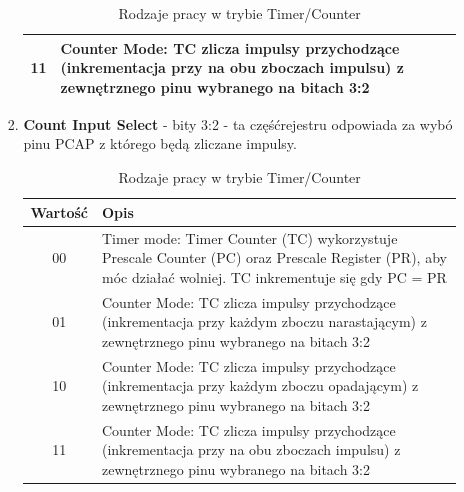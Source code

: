 \begin{enumerate}
\begin{enumerate}
\begin{enumerate}
\begin{table}[H]
\begin{tabular}{|c|p{13cm}|}
                    \hline
                    11 & Counter Mode: TC zlicza impulsy przychodzące (inkrementacja przy na obu zboczach impulsu) z zewnętrznego pinu wybranego na bitach 3:2  \\
                    \hline
                \end{tabular}
                \caption{Rodzaje pracy w trybie Timer/Counter}
            \end{table}
            \item \textbf{Count Input Select} - bity 3:2 - ta częśćrejestru odpowiada za wybó pinu PCAP z którego będą zliczane impulsy.\\
            \begin{table}[H]
                \centering
                \begin{tabular}{|c|p{13cm}|}
                    \hline
                    \rowcolor{gray!30}
                    Wartość & Opis\\
                    \hline
                    00  & Timer mode: Timer Counter (TC) wykorzystuje Prescale Counter (PC) oraz Prescale Register (PR), aby móc działać wolniej. TC inkrementuje się gdy PC = PR\\
                    \hline
                    01 & Counter Mode: TC zlicza impulsy przychodzące (inkrementacja przy każdym zboczu narastającym) z zewnętrznego pinu wybranego na bitach 3:2  \\
                    \hline
                    10 & Counter Mode: TC zlicza impulsy przychodzące (inkrementacja przy każdym zboczu opadającym) z zewnętrznego pinu wybranego na bitach 3:2  \\
                    \hline
                    11 & Counter Mode: TC zlicza impulsy przychodzące (inkrementacja przy na obu zboczach impulsu) z zewnętrznego pinu wybranego na bitach 3:2  \\
                    \hline
                \end{tabular}
                \caption{Rodzaje pracy w trybie Timer/Counter}
            \end{table}
            

\end{enumerate}
\end{enumerate}
\end{enumerate}
